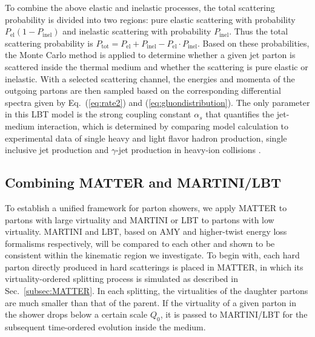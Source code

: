 \documentclass[aps,prc,twocolumn,floatfix,superscriptaddress,nofootinbib]{revtex4}
\begin{document}
To combine the above elastic and inelastic processes, the total scattering probability is divided into two regions: pure elastic scattering with probability $P_\mathrm{el}(1-P_\mathrm{inel})$ and inelastic scattering with probability $P_\mathrm{inel}$. Thus the total scattering probability is $P_\mathrm{tot}=P_\mathrm{el}+P_\mathrm{inel}-P_\mathrm{el}\cdot P_\mathrm{inel}$. Based on these probabilities, the Monte Carlo method is applied to determine whether a given jet parton is scattered inside the thermal medium and whether the scattering is pure elastic or inelastic. With a selected scattering channel, the energies and momenta of the outgoing partons are then sampled based on the corresponding differential spectra given by Eq.~(\ref{eq:rate2}) and (\ref{eq:gluondistribution}). The only parameter in this LBT model is the strong coupling constant $\alpha_s$ that quantifies the jet-medium interaction, which is determined by comparing model calculation to experimental data of single heavy and light flavor hadron production, single inclusive jet production and $\gamma$-jet production in heavy-ion collisions \cite{Cao:2017hhk,Cao:2016gvr,Li:2010ts,Wang:2013cia,Chen:2017zte}.


\subsection{Combining MATTER and MARTINI/LBT}
\label{subsec:combine}

To establish a unified framework for parton showers, we apply MATTER to partons with large virtuality and MARTINI or LBT to partons with low virtuality. MARTINI and LBT, based on AMY and higher-twist energy loss formalisms respectively, will be compared to each other and shown to be consistent within the kinematic region we investigate. To begin with, each hard parton directly produced in hard scatterings is placed in MATTER, in which its virtuality-ordered splitting process is simulated as described in Sec.~\ref{subsec:MATTER}. In each splitting, the virtualities of the daughter partons are much smaller than that of the parent. If the virtuality of a given parton in the shower drops below a certain scale $Q_0$, it is passed to MARTINI/LBT for the subsequent time-ordered evolution inside the medium. 
\end{document}
